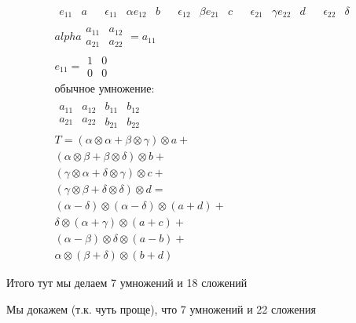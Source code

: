 \begin{gather*}
    \begin{matrix}
        e_{11} & a & & \epsilon_{11} & \alpha
        e_{12} & b & & \epsilon_{12} & \beta
        e_{21} & c & & \epsilon_{21} & \gamma
        e_{22} & d & & \epsilon_{22} & \delta
    \end{matrix}\\
    alpha \begin{matrix}
        a_{11} & a_{12} \\
        a_{21} & a_{22}
    \end{matrix} = a_{11} \\
    e_{11} = \begin{matrix}
    1 & 0 \\
    0 & 0
    \end{matrix}\\
    \text{обычное умножение:} \\
    \begin{matrix}
        a_{11} & a_{12} \\
        a_{21} & a_{22}
    \end{matrix}
    \begin{matrix}
        b_{11} & b_{12} \\
        b_{21} & b_{22}
    \end{matrix} \\
    T = (\alpha \otimes \alpha + \beta  \otimes \gamma) \otimes a + \\
        (\alpha \otimes \beta  + \beta  \otimes \delta) \otimes b + \\
        (\gamma \otimes \alpha + \delta \otimes \gamma) \otimes c + \\
        (\gamma \otimes \beta  + \delta \otimes \delta) \otimes d = \\
        (\alpha - \delta) \otimes (\alpha - \delta) \otimes (a + d) + \\
        \delta \otimes (\alpha + \gamma) \otimes (a + c) + \\
        (\alpha - \beta) \otimes \delta \otimes (a - b) + \\
        \alpha \otimes (\beta + \delta) \otimes (b + d)
\end{gather*}

Итого тут мы делаем 7 умножений и 18 сложений

Мы докажем (т.к. чуть проще), что 7 умножений и 22 сложения

